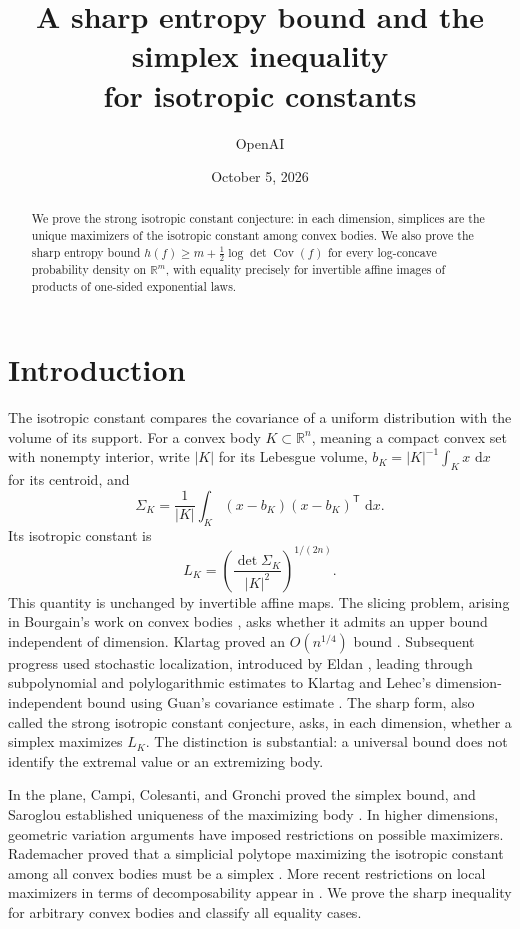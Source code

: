 \documentclass[11pt]{article}
\title{A sharp entropy bound and the simplex inequality\protect\\ for isotropic constants}
\author{OpenAI}
\date{October 5, 2026}
\newcommand{\R}{\mathbb R}
\DeclareMathOperator{\Cov}{Cov}
\newcommand{\dd}{\,\mathrm d}
\theoremstyle{definition}
\theoremstyle{remark}
\numberwithin{equation}{section}
\begin{document}
\maketitle
\begin{abstract}
We prove the strong isotropic constant conjecture: in each dimension,
simplices are the unique maximizers of the isotropic constant among
convex bodies. We also prove the sharp entropy bound
$h(f)\ge m+\tfrac12\log\det\Cov(f)$ for every log-concave probability
density on $\R^m$, with equality precisely for invertible affine
images of products of one-sided exponential laws.
\end{abstract}

\section{Introduction}

The isotropic constant compares the covariance of a uniform distribution
with the volume of its support.  For a convex body $K\subset\R^n$,
meaning a compact convex set with nonempty interior, write $|K|$ for its
Lebesgue volume, $b_K=|K|^{-1}\int_Kx\,\dd x$ for its centroid, and
\[
 \Sigma_K=\frac1{|K|}\int_K(x-b_K)(x-b_K)^{\mathsf T}\,\dd x.
\]
Its isotropic constant is
\begin{equation}\label{intro:isotropic-constant}
 L_K=\left(\frac{\det\Sigma_K}{|K|^2}\right)^{1/(2n)}.
\end{equation}
This quantity is unchanged by invertible affine maps.  The slicing
problem, arising in Bourgain's work on convex bodies
\cite{Bourgain1986}, asks whether it admits an upper bound independent
of dimension.  Klartag proved an $O(n^{1/4})$ bound
\cite{Klartag2006}.  Subsequent progress used stochastic localization,
introduced by Eldan \cite{Eldan2013}, leading through subpolynomial
and polylogarithmic estimates \cite{Chen2021,KlartagLehec2022,Klartag2023}
to Klartag and Lehec's dimension-independent bound using Guan's
covariance estimate \cite{Guan2024,KlartagLehec2025}.
The sharp form, also called the strong isotropic constant conjecture,
asks, in each dimension, whether a simplex maximizes $L_K$.
The distinction is substantial: a universal bound does not
identify the extremal value or an extremizing body.

In the plane, Campi, Colesanti, and Gronchi proved the simplex bound,
and Saroglou established uniqueness of the maximizing body
\cite{CampiColesantiGronchi1999,Saroglou2010}.
In higher dimensions, geometric variation arguments have imposed
restrictions on possible maximizers.  Rademacher proved that a
simplicial polytope maximizing the isotropic constant among all convex
bodies must be a simplex \cite{Rademacher2016}. More recent restrictions on local
maximizers in terms of decomposability appear in \cite{Kipp2026}.
We prove the sharp inequality for arbitrary convex bodies and classify
all equality cases.
\end{document}
